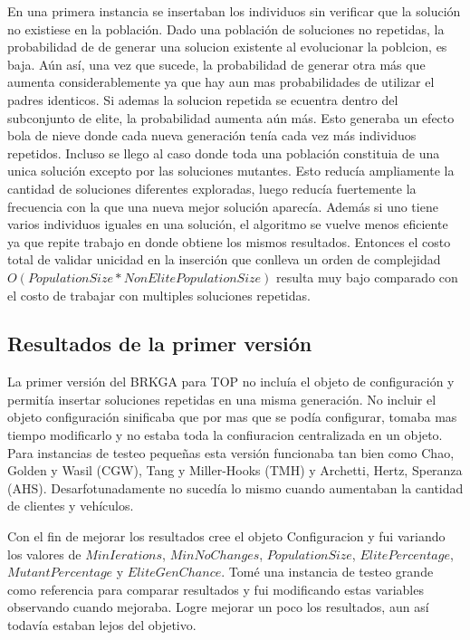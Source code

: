 En una primera instancia se insertaban los individuos sin verificar que la solución no existiese en la población. Dado una población de soluciones no repetidas, la probabilidad de de generar una solucion existente al evolucionar la poblcion, es baja. Aún así, una vez que sucede, la probabilidad de generar otra más que aumenta considerablemente ya que hay aun mas probabilidades de utilizar el padres identicos. Si ademas la solucion repetida se ecuentra dentro del subconjunto de elite, la probabilidad aumenta aún más. Esto generaba un efecto bola de nieve donde cada nueva generación tenía cada vez más individuos repetidos. Incluso se llego al caso donde toda una población constituia de una unica solución excepto por las soluciones mutantes. Esto reducía ampliamente la cantidad de soluciones diferentes exploradas, luego reducía fuertemente la frecuencia con la que una nueva mejor solución aparecía. Además si uno tiene varios individuos iguales en una solución, el algoritmo se vuelve menos eficiente ya que repite trabajo en donde obtiene los mismos resultados. Entonces el costo total de validar unicidad en la inserción que conlleva un orden de complejidad $O(PopulationSize * NonElitePopulationSize)$ resulta muy bajo comparado con el costo de trabajar con multiples soluciones repetidas.

\subsection{Resultados de la primer versión}

La primer versión del BRKGA para TOP no incluía el objeto de configuración y permitía insertar soluciones repetidas en una misma generación. No incluir el objeto configuración sinificaba que por mas que se podía configurar, tomaba mas tiempo modificarlo y no estaba toda la confiuracion centralizada en un objeto. Para instancias de testeo pequeñas esta versión funcionaba tan bien como Chao, Golden y Wasil (CGW), Tang y Miller-Hooks (TMH) y Archetti, Hertz, Speranza (AHS). Desarfotunadamente no sucedía lo mismo cuando aumentaban la cantidad de clientes y vehículos.

\bigskip

Con el fin de mejorar los resultados cree el objeto Configuracion y fui variando los valores de $MinIerations$, $MinNoChanges$, $PopulationSize$, $ElitePercentage$, $MutantPercentage$ y $EliteGenChance$. Tomé una instancia de testeo grande como referencia para comparar resultados y fui modificando estas variables observando cuando mejoraba. Logre mejorar un poco los resultados, aun así todavía estaban lejos del objetivo.

